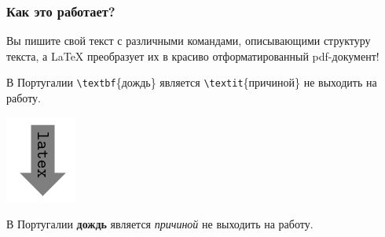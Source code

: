 \documentclass[newPxFont]{beamer}
\begin{document}
\begin{frame}[fragile]
\frametitle{Как это работает?}
Вы пишите свой текст с различными {\color{green} командами}, описывающими структуру текста, а \LaTeX{} преобразует их в красиво отформатированный pdf-документ!

\begin{mdframed}[backgroundcolor=LTXLightGreen]
В Португалии \verb|\textbf|\{дождь\} является \verb|\textit|\{причиной\}  не выходить на работу.
\end{mdframed}

\centering
   \includegraphics[scale=0.3]{fuc.png}%

\begin{mdframed}[backgroundcolor=LTXLightGreen] 
В Португалии \textbf{дождь} является \textit{причиной} не выходить на работу.
\end{mdframed}   
\end{frame}
\end{document}
